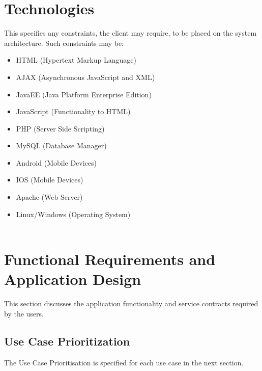 \documentclass[a4paper]{article}
\begin{document}
\section{Technologies}
    This specifies any constraints, the client may require, to be placed on the system architecture. Such constraints may be:
    \begin{itemize}
        \item HTML (Hypertext Markup Language)
        \item AJAX (Asynchronous JavaScript and XML)
        \item JavaEE (Java Platform Enterprise Edition)
        \item JavaScript (Functionality to HTML)
        \item PHP (Server Side Scripting)
        \item MySQL (Database Manager)
        \item Android (Mobile Devices)
        \item IOS (Mobile Devices)
        \item Apache (Web Server)
        \item Linux/Windows (Operating System)
        \\
        \\
    \end{itemize}
    \pagebreak


    

















\section{Functional Requirements and Application Design}
	This section discusses the application functionality and service contracts required by the users.
    \subsection{Use Case Prioritization}
    	The Use Case Prioritisation is specified for each use case in the next section.
	
\end{document}
